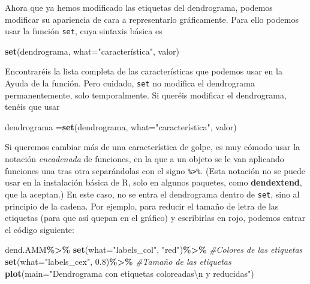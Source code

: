 \documentclass[
]{book}
\newenvironment{Shaded}{\begin{snugshade}}{\end{snugshade}}
\newcommand{\CharTok}[1]{\textcolor[rgb]{0.31,0.60,0.02}{#1}}
\newcommand{\CommentTok}[1]{\textcolor[rgb]{0.56,0.35,0.01}{\textit{#1}}}
\newcommand{\DataTypeTok}[1]{\textcolor[rgb]{0.13,0.29,0.53}{#1}}
\newcommand{\FloatTok}[1]{\textcolor[rgb]{0.00,0.00,0.81}{#1}}
\newcommand{\KeywordTok}[1]{\textcolor[rgb]{0.13,0.29,0.53}{\textbf{#1}}}
\newcommand{\NormalTok}[1]{#1}
\newcommand{\OperatorTok}[1]{\textcolor[rgb]{0.81,0.36,0.00}{\textbf{#1}}}
\newcommand{\StringTok}[1]{\textcolor[rgb]{0.31,0.60,0.02}{#1}}
\theoremstyle{definition}
\theoremstyle{definition}
\theoremstyle{definition}
\theoremstyle{remark}
\begin{document}
Ahora que ya hemos modificado las etiquetas del dendrograma, podemos modificar su apariencia de cara a representarlo gráficamente. Para ello podemos usar la función \texttt{set}, cuya sintaxis básica es

\begin{Shaded}
\begin{Highlighting}[]
\KeywordTok{set}\NormalTok{(dendrograma, }\DataTypeTok{what=}\StringTok{"característica"}\NormalTok{, valor)}
\end{Highlighting}
\end{Shaded}

Encontraréis la lista completa de las características que podemos usar en la Ayuda de la función.
Pero cuidado, \texttt{set} no modifica el dendrograma permanentemente, solo temporalmente. Si queréis modificar el dendrograma, tenéis que usar

\begin{Shaded}
\begin{Highlighting}[]
\NormalTok{dendrograma =}\KeywordTok{set}\NormalTok{(dendrograma, }\DataTypeTok{what=}\StringTok{"característica"}\NormalTok{, valor)}
\end{Highlighting}
\end{Shaded}

Si queremos cambiar más de una característica de golpe, es muy cómodo usar la notación \emph{encadenada} de funciones, en la que a un objeto se le van aplicando funciones una tras otra separándolas con el signo \texttt{\%\textgreater{}\%}. (Esta notación no se puede usar en la instalación básica de R, solo en algunos paquetes, como \textbf{dendextend}, que la aceptan.)
En este caso, no se entra el dendrograma dentro de \texttt{set}, sino al principio de la cadena.
Por ejemplo, para reducir el tamaño de letra de las etiquetas (para que así quepan en el gráfico) y escribirlas en rojo, podemos entrar el código siguiente:

\begin{Shaded}
\begin{Highlighting}[]
\NormalTok{dend.AMM}\OperatorTok{\%\textgreater{}\%}
\StringTok{   }\KeywordTok{set}\NormalTok{(}\DataTypeTok{what=}\StringTok{"labels\_col"}\NormalTok{, }\StringTok{"red"}\NormalTok{)}\OperatorTok{\%\textgreater{}\%}\StringTok{ }\CommentTok{\#Colores de las etiquetas}
\StringTok{   }\KeywordTok{set}\NormalTok{(}\DataTypeTok{what=}\StringTok{"labels\_cex"}\NormalTok{, }\FloatTok{0.8}\NormalTok{)}\OperatorTok{\%\textgreater{}\%}\StringTok{ }\CommentTok{\#Tamaño de las etiquetas}
\StringTok{   }\KeywordTok{plot}\NormalTok{(}\DataTypeTok{main=}\StringTok{"Dendrograma con etiquetas coloreadas}\CharTok{\textbackslash{}n}\StringTok{ y reducidas"}\NormalTok{)}
\end{Highlighting}
\end{Shaded}
\end{document}
